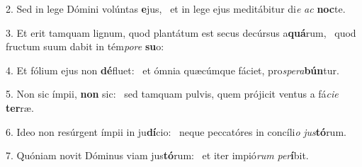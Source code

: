 2. Sed in lege Dómini volúntas \textbf{e}jus, \ast\  et in lege ejus meditábitur di\textit{e} \textit{ac} \textbf{noc}te.\

3. Et erit tamquam lignum, quod plantátum est secus decúrsus a\textbf{quá}rum, \ast\  quod fructum suum dabit in tém\textit{po}\textit{re} \textbf{su}o:\

4. Et fólium ejus non \textbf{dé}fluet: \ast\  et ómnia quæcúmque fáciet, pro\textit{spe}\textit{ra}\textbf{bún}tur.\

5. Non sic ímpii, \textbf{non} sic: \ast\  sed tamquam pulvis, quem prójicit ventus a fá\textit{ci}\textit{e} \textbf{ter}ræ.\

6. Ideo non resúrgent ímpii in ju\textbf{dí}cio: \ast\  neque peccatóres in concíli\textit{o} \textit{jus}\textbf{tó}rum.\

7. Quóniam novit Dóminus viam jus\textbf{tó}rum: \ast\  et iter impió\textit{rum} \textit{per}\textbf{í}bit.\

